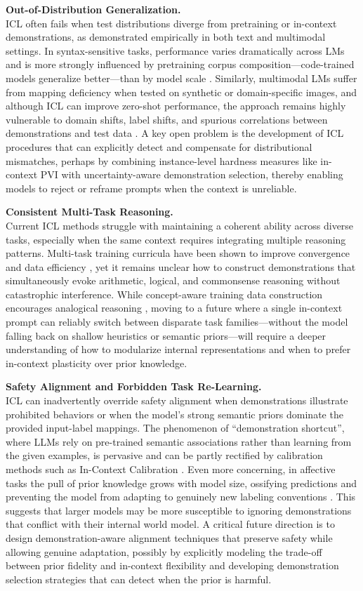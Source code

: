\documentclass[11pt]{article}
\begin{document}
\textbf{Out-of-Distribution Generalization.}\\
ICL often fails when test distributions diverge from pretraining or in-context demonstrations, as demonstrated empirically in both text and multimodal settings. In syntax-sensitive tasks, performance varies dramatically across LMs and is more strongly influenced by pretraining corpus composition---code-trained models generalize better---than by model scale \cite{ref184}. Similarly, multimodal LMs suffer from mapping deficiency when tested on synthetic or domain-specific images, and although ICL can improve zero-shot performance, the approach remains highly vulnerable to domain shifts, label shifts, and spurious correlations between demonstrations and test data \cite{ref185}. A key open problem is the development of ICL procedures that can explicitly detect and compensate for distributional mismatches, perhaps by combining instance-level hardness measures like in-context PVI \cite{ref186} with uncertainty-aware demonstration selection, thereby enabling models to reject or reframe prompts when the context is unreliable.

\textbf{Consistent Multi-Task Reasoning.}\\
Current ICL methods struggle with maintaining a coherent ability across diverse tasks, especially when the same context requires integrating multiple reasoning patterns. Multi-task training curricula have been shown to improve convergence and data efficiency \cite{ref187}, yet it remains unclear how to construct demonstrations that simultaneously evoke arithmetic, logical, and commonsense reasoning without catastrophic interference. While concept-aware training data construction encourages analogical reasoning \cite{ref109}, moving to a future where a single in-context prompt can reliably switch between disparate task families---without the model falling back on shallow heuristics or semantic priors---will require a deeper understanding of how to modularize internal representations and when to prefer in-context plasticity over prior knowledge.

\textbf{Safety Alignment and Forbidden Task Re-Learning.}\\
ICL can inadvertently override safety alignment when demonstrations illustrate prohibited behaviors or when the model's strong semantic priors dominate the provided input-label mappings. The phenomenon of ``demonstration shortcut'', where LLMs rely on pre-trained semantic associations rather than learning from the given examples, is pervasive and can be partly rectified by calibration methods such as In-Context Calibration \cite{ref39}. Even more concerning, in affective tasks the pull of prior knowledge grows with model size, ossifying predictions and preventing the model from adapting to genuinely new labeling conventions \cite{ref42}. This suggests that larger models may be more susceptible to ignoring demonstrations that conflict with their internal world model. A critical future direction is to design demonstration-aware alignment techniques that preserve safety while allowing genuine adaptation, possibly by explicitly modeling the trade-off between prior fidelity and in-context flexibility and developing demonstration selection strategies that can detect when the prior is harmful.
\end{document}
